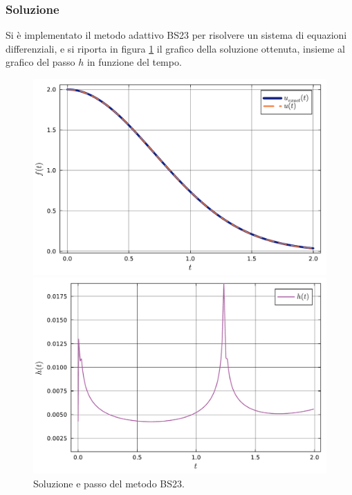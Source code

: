 \documentclass[letterpaper, 12pt]{article}
\numberwithin{equation}{section}    %
\begin{document}
\subsubsection{Soluzione}
Si è implementato il metodo adattivo BS23 per risolvere un sistema di equazioni differenziali, e si riporta in 
figura \ref{fig:es6_3_5_1} il grafico della soluzione ottenuta, insieme al grafico del passo $h$ in funzione del
tempo. \\
\begin{figure}[!ht]
    \centering
    \begin{minipage}[b]{0.40\textwidth}
        \includegraphics[width=\textwidth]{6351.pdf}
    \end{minipage}
    \hspace{0.5cm}
    \begin{minipage}[b]{0.40\textwidth}
        \includegraphics[width=\textwidth]{6352.pdf}
    \end{minipage}
    \caption{Soluzione e passo del metodo BS23.}
    \label{fig:es6_3_5_1}
\end{figure}
\end{document}
